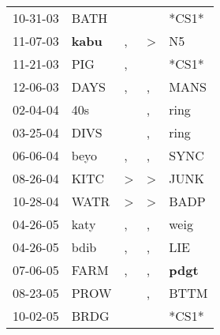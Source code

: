 \begin{supertabular}{p{0.07\textwidth}p{0.06\textwidth}p{0.02\textwidth}p{0.02\textwidth}p{0.06\textwidth}}
 10-31-03\textsuperscript{} &           BATH\textsuperscript{} &                  &               &                            *CS1* \\
 11-07-03\textsuperscript{} &  \textbf{kabu\textsuperscript{}} &                , &  \textgreater &             N5\textsuperscript{} \\
 11-21-03\textsuperscript{} &            PIG\textsuperscript{} &                , &               &                            *CS1* \\
 12-06-03\textsuperscript{} &           DAYS\textsuperscript{} &                , &             , &           MANS\textsuperscript{} \\
 02-04-04\textsuperscript{} &            40s\textsuperscript{} &                  &             , &           ring\textsuperscript{} \\
 03-25-04\textsuperscript{} &           DIVS\textsuperscript{} &                  &             , &           ring\textsuperscript{} \\
 06-06-04\textsuperscript{} &           beyo\textsuperscript{} &                , &             , &           SYNC\textsuperscript{} \\
 08-26-04\textsuperscript{} &           KITC\textsuperscript{} &     \textgreater &  \textgreater &           JUNK\textsuperscript{} \\
 10-28-04\textsuperscript{} &           WATR\textsuperscript{} &     \textgreater &  \textgreater &           BADP\textsuperscript{} \\
 04-26-05\textsuperscript{} &           katy\textsuperscript{} &                , &             , &           weig\textsuperscript{} \\
 04-26-05\textsuperscript{} &           bdib\textsuperscript{} &                , &             , &            LIE\textsuperscript{} \\
 07-06-05\textsuperscript{} &           FARM\textsuperscript{} &                , &             , &  \textbf{pdgt\textsuperscript{}} \\
 08-23-05\textsuperscript{} &           PROW\textsuperscript{} &                  &             , &           BTTM\textsuperscript{} \\
 10-02-05\textsuperscript{} &           BRDG\textsuperscript{} &                  &               &                            *CS1* \\

\end{supertabular}
